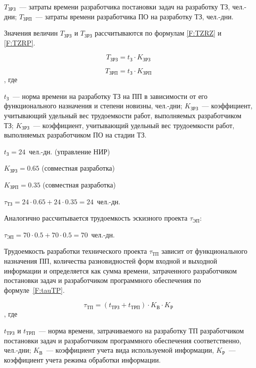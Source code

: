 $T_{\text{ЗРЗ}}$~--- затраты времени разработчика постановки задач на разработку ТЗ, чел.-дни; $T_{\text{ЗРП}}$~--- затраты времени разработчика ПО на разработку ТЗ, чел.-дни.

Значения величин $T_{\text{ЗРЗ}}$ и $T_{\text{ЗРЗ}}$ рассчитываются по формулам \ref{F:TZRZ} и \ref{F:TZRP}.

\begin{equation}
T_{\text{ЗРЗ}} = t_{\text{З}} \cdot K_{\text{ЗРЗ}}
\label{F:TZRZ}
\end{equation}

\begin{equation}
T_{\text{ЗРП}} = t_{\text{З}} \cdot K_{\text{ЗРП}}
\label{F:TZRP}
\end{equation}, где

$t_{\text{З}}$~--- норма времени на разработку ТЗ на ПП в зависимости от его функционального назначения и степени новизны, чел.-дни; $K_{\text{ЗРЗ}}$~--- коэффициент, учитывающий удельный вес трудоемкости работ, выполняемых разработчиком ТЗ; $K_{\text{ЗРЗ}}$~--- коэффициент, учитывающий удельный вес трудоемкости работ, выполняемых разработчиком ПО на стадии ТЗ.

$t_{\text{З}} = 24$~чел.-дн. (управление НИР)

$K_{\text{ЗРЗ}} = 0.65$ (совместная разработка)

$K_{\text{ЗРП}} = 0.35$ (совместная разработка)

$\tau_{\text{ТЗ}} = 24 \cdot 0.65 + 24 \cdot 0.35 = 24$~чел.-дн.

Аналогично рассчитывается трудоемкость эскизного проекта $\tau_{\text{ЭП}}$:

$\tau_{\text{ЭП}} = 70 \cdot 0.5 + 70 \cdot 0.5 = 70$~чел.-дн.

Трудоемкость разработки технического проекта $\tau_{\text{ТП}}$ зависит от функционального назначения ПП, количества разновидностей форм входной и выходной информации и определяется как сумма времени, затраченного разработчиком постановки задач и разработчиком программного обеспечения по формуле~\ref{F:tauTP}.

\begin{equation}
\tau_{\text{ТП}} = (t_{\text{ТРЗ}} + t_{\text{ТРП}}) \cdot K_{\text{В}} \cdot K_{\text{Р}}
\label{F:tauTP}
\end{equation}, где

$t_{\text{ТРЗ}}$ и $t_{\text{ТРП}}$~--- норма времени, затрачиваемого на разработку ТП разработчиком постановки задач и разработчиком программного обеспечения соответственно, чел.-дни; $K_{\text{В}}$~--- коэффициент учета вида используемой информации, $K_{\text{Р}}$~--- коэффициент учета режима обработки информации.


